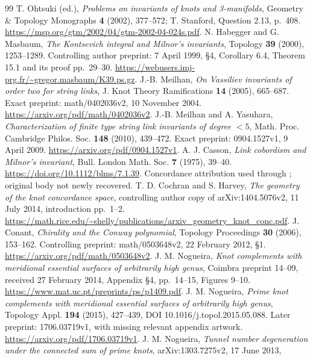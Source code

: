 \documentclass[11pt]{article}
\theoremstyle{remark}\newtheorem{remark}[theorem]{Remark}
\begin{document}
\begin{thebibliography}{99}\small
{} T. Ohtsuki (ed.), \emph{Problems on invariants of knots
and 3-manifolds}, Geometry \& Topology Monographs \textbf{4} (2002),
377--572; T. Stanford, Question 2.13, p.~408.
\url{https://msp.org/gtm/2002/04/gtm-2002-04-024s.pdf}.
 N. Habegger and G. Masbaum, \emph{The Kontsevich integral and
Milnor's invariants}, Topology \textbf{39} (2000), 1253--1289. Controlling
author preprint: 7 April 1999, \S4, Corollary 6.4, Theorem 15.1 and its
proof pp.~29--30. \url{https://webusers.imj-prg.fr/~gregor.masbaum/K39.ps.gz}.
 J.-B. Meilhan, \emph{On Vassiliev invariants of order two
for string links}, J. Knot Theory Ramifications \textbf{14} (2005),
665--687. Exact preprint: math/0402036v2, 10 November 2004.
\url{https://arxiv.org/pdf/math/0402036v2}.
 J.-B. Meilhan and A. Yasuhara, \emph{Characterization of finite
type string link invariants of degree $<5$}, Math. Proc. Cambridge Philos.
Soc. \textbf{148} (2010), 439--472. Exact preprint: 0904.1527v1,
9 April 2009. \url{https://arxiv.org/pdf/0904.1527v1}.
 A. J. Casson, \emph{Link cobordism and Milnor's invariant},
Bull. London Math. Soc. \textbf{7} (1975), 39--40.
\url{https://doi.org/10.1112/blms/7.1.39}. Concordance attribution used
through \cite{HM,MY09}; original body not newly recovered.
 T. D. Cochran and S. Harvey, \emph{The geometry of
the knot concordance space}, controlling author copy of arXiv:1404.5076v2,
11 July 2014, introduction pp.~1--2.
\url{https://math.rice.edu/~shelly/publications/arxiv_geometry_knot_conc.pdf}.
 J. Conant, \emph{Chirality and the Conway polynomial},
Topology Proceedings \textbf{30} (2006), 153--162.
Controlling preprint: math/0503648v2, 22 February 2012, \S1.
\url{https://arxiv.org/pdf/math/0503648v2}.
 J. M. Nogueira, \emph{Knot complements with meridional
essential surfaces of arbitrarily high genus}, Coimbra preprint 14--09,
received 27 February 2014, Appendix \S4, pp.~14--15, Figures 9--10.
\url{https://www.mat.uc.pt/preprints/ps/p1409.pdf}.
 J. M. Nogueira, \emph{Prime knot complements with
meridional essential surfaces of arbitrarily high genus}, Topology Appl.
\textbf{194} (2015), 427--439, DOI 10.1016/j.topol.2015.05.088.
Later preprint: 1706.03719v1, with missing relevant appendix artwork.
\url{https://arxiv.org/pdf/1706.03719v1}.
 J. M. Nogueira, \emph{Tunnel number degeneration under
the connected sum of prime knots}, arXiv:1303.7275v2, 17 June 2013,

\end{thebibliography}
\end{document}
